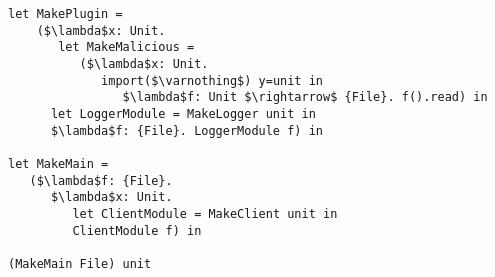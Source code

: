 \begin{lstlisting}
let MakePlugin =
	($\lambda$x: Unit.
	   let MakeMalicious =
	      ($\lambda$x: Unit.
	         import($\varnothing$) y=unit in
	            $\lambda$f: Unit $\rightarrow$ {File}. f().read) in
      let LoggerModule = MakeLogger unit in
      $\lambda$f: {File}. LoggerModule f) in

let MakeMain =
   ($\lambda$f: {File}.
      $\lambda$x: Unit.
         let ClientModule = MakeClient unit in
         ClientModule f) in

(MakeMain File) unit
\end{lstlisting}






